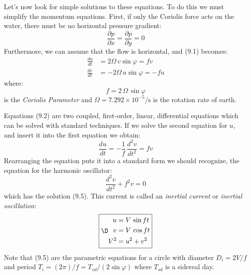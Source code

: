 Let's now look for simple solutions to these equations. To do this we
must simplify the momentum equations. First, if only the Coriolis
force acts on the water, there must be no horizontal pressure
gradient:
\begin{displaymath}
\frac{\partial{p}}{\partial{x}} = \frac{\partial{p}}{\partial{y}} = 0
\end{displaymath}
Furthermore, we can assume that the flow is horizontal, and (9.1)
becomes:
\begin{subequations}
\begin{align}
\frac{du}{dt}&=2\Omega \,v \sin\varphi =fv \\
\frac{dv}{dt}&=-2\Omega \,u \sin\varphi = -fu
\end{align}
\end{subequations}
where:
\begin{equation}
\boxed{f = 2\,\Omega\,\sin\varphi }
\end{equation}
is the \textit{Coriolis Parameter}
and $\Omega = 7.292 \times 10^{-5}$/s is the rotation rate of earth.

Equations (9.2) are two coupled, first-order, linear, differential
equations which can be solved with standard techniques. If we solve
the second equation for $u$, and insert it into the first equation we
obtain:
\begin{displaymath}
\frac{du}{dt}=-\frac{1}{f}\,\frac{d^2v}{dt^2}=fv
\end{displaymath}
Rearranging the equation puts it into a standard form we should
recognize, the equation for the harmonic oscillator:
\begin{equation}
\frac{d^2v}{dt^2} + f^2v = 0
\end{equation}
which has the solution (9.5). This current is called an
\textit{inertial current} or
\textit{inertial oscillation}:
\begin{equation}
\fbox{$ \D \begin{aligned}%
u &= V\, \sin ft \\
v &= V\, \cos ft \\
V^2  &= u^2+v^2 \end{aligned}$}
\end{equation}
Note that (9.5) are the parametric equations for a circle with
diameter $D_i = 2V/f$ and period
$T_i = (2\pi)/f=T_{sd}/(2\sin\varphi)$ where $T_{sd}$ is a sidereal day.

